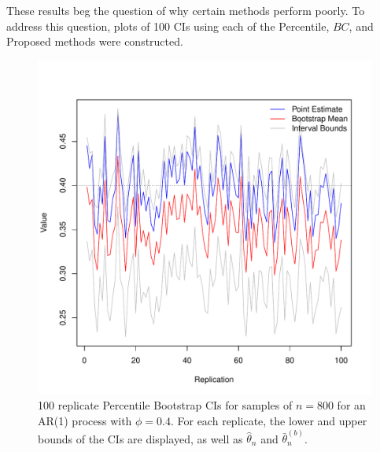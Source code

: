 \documentclass[12pt, letterpaper, titlepage]{article}
\begin{document}
These results beg the question of why certain methods perform poorly. To address 
this question, plots of 100 CIs using each of the Percentile, $BC$, and Proposed 
methods were constructed. 

\begin{figure}[tbp]
  \centering
  \includegraphics[width=\textwidth]{figures/pct}
  \caption{100 replicate Percentile Bootstrap CIs for samples of $n = 800$ for
    an AR(1) process with $\phi = 0.4$. For each replicate, the lower and upper bounds
    of the CIs are displayed, as well as $\hat\theta_n$ and $\bar\theta_n^{(b)}$. }
  \label{fig:pct}
\end{figure}
\end{document}
